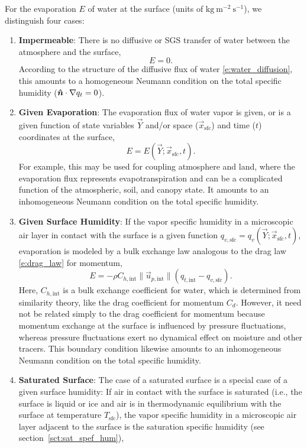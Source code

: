 \documentclass{report}
\begin{document}
For the evaporation $E$ of water at the surface (units of $\mathrm{kg~m^{-2}~s^{-1}}$), we distinguish four cases:
\begin{enumerate}
    \item \textbf{Impermeable}: There is no diffusive or SGS transfer of water between the atmosphere and the surface,
    \[
    E = 0.
    \]
    According to the structure of the diffusive flux of water \eqref{e:water_diffusion}, this amounts to a homogeneous Neumann condition on the total specific humidity ($\boldsymbol{{\hat n}}\cdot\nabla q_t = 0$).
    \item \textbf{Given Evaporation}: The evaporation flux of water vapor is given, or is a given function of state variables $\vec{Y}$ and/or space ($\vec{x}_\mathrm{sfc}$) and time ($t$) coordinates at the surface,
    \[
    E = E(\vec{Y}; \vec{x}_\mathrm{sfc}, t).
    \]
    For example, this may be used for coupling atmosphere and land, where the evaporation flux represents evapotranspiration and can be a complicated function of the atmospheric, soil, and canopy state. It amounts to an inhomogeneous Neumann condition on the total specific humidity.
    \item \textbf{Given Surface Humidity}: If the vapor specific humidity in a microscopic air layer in contact with the surface is a given function $q_{v, \mathrm{sfc}} = q_{v}(\vec{Y}; \vec{x}_\mathrm{sfc}, t)$, evaporation is modeled by a bulk exchange law analogous to the drag law \eqref{e:drag_law} for momentum,
    \begin{equation}\label{e:sfc_evaporation}
    E = - \rho C_{h, \mathrm{int}} \| \vec{u}_{p, \mathrm{int}} \| \left( q_{t, \mathrm{int}} - q_{v, \mathrm{sfc}} \right).
    \end{equation} 
    Here, $C_{h, \mathrm{int}}$ is a bulk exchange coefficient for water, which is determined from similarity theory, like the drag coefficient for momentum $C_d$. However, it need not be related simply to the drag coefficient for momentum because momentum exchange at the surface is influenced by pressure fluctuations, whereas pressure fluctuations exert no dynamical effect on moisture and other tracers. This boundary condition likewise amounts to an inhomogeneous Neumann condition on the total specific humidity.
    \item \textbf{Saturated Surface}: The case of a saturated surface is a special case of a given surface humidity: If air in contact with the surface is saturated (i.e., the surface is liquid or ice and air is in thermodynamic equilibrium with the surface at temperature $T_\mathrm{sfc}$), the vapor specific humidity in a microscopic air layer adjacent to the surface is the saturation specific humidity (see section~\ref{sct:sat_spef_hum}),

\end{enumerate}
\end{document}
